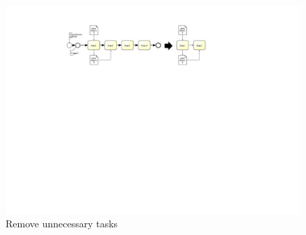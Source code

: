 \begin{figure}[h!]
	\includegraphics[width=\textwidth, trim={7.5cm 15.3cm 8.5cm 1.5cm}]{img/ExtractDFDRemove.pdf}
	\caption{Remove unnecessary tasks}
	\label{fig:removeDataFlow}
\end{figure}



\pagebreak





